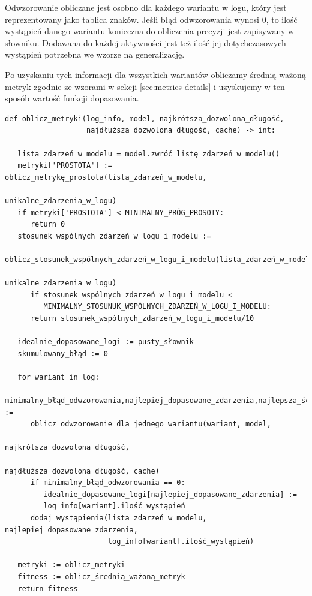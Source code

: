 Odwzorowanie obliczane jest osobno dla każdego wariantu w logu, który jest reprezentowany jako tablica znaków. Jeśli błąd odwzorowania wynosi 0, to ilość wystąpień danego wariantu konieczna do obliczenia precyzji jest zapisywany w słowniku. Dodawana do każdej aktywności jest też ilość jej dotychczasowych wystąpień potrzebna we wzorze na generalizację.

Po uzyskaniu tych informacji dla wszystkich wariantów obliczamy średnią ważoną metryk zgodnie ze wzorami w sekcji \ref{sec:metrics-details} i uzyskujemy w ten sposób wartość funkcji dopasowania.

\lstset{caption=Obliczanie metryk, captionpos=b}
\lstset{label=src:best_result, frame=single}
\begin{lstlisting}[escapeinside=``]
def oblicz_metryki(log_info, model, najkrótsza_dozwolona_długość, 
                   najdłuższa_dozwolona_długość, cache) -> int:
                   
   lista_zdarzeń_w_modelu = model.zwróć_listę_zdarzeń_w_modelu()
   metryki['PROSTOTA'] := oblicz_metrykę_prostota(lista_zdarzeń_w_modelu, 
                                                  unikalne_zdarzenia_w_logu)
   if metryki['PROSTOTA'] < MINIMALNY_PRÓG_PROSOTY:
      return 0
   stosunek_wspólnych_zdarzeń_w_logu_i_modelu := 
      oblicz_stosunek_wspólnych_zdarzeń_w_logu_i_modelu(lista_zdarzeń_w_modelu, 
                                                        unikalne_zdarzenia_w_logu)		   
      if stosunek_wspólnych_zdarzeń_w_logu_i_modelu <
         MINIMALNY_STOSUNUK_WSPÓLNYCH_ZDARZEŃ_W_LOGU_I_MODELU:
      return stosunek_wspólnych_zdarzeń_w_logu_i_modelu/10
        
   idealnie_dopasowane_logi := pusty_słownik
   skumulowany_błąd := 0
    
   for wariant in log:
      minimalny_błąd_odwzorowania,najlepiej_dopasowane_zdarzenia,najlepsza_ścieżka := 
      oblicz_odwzorowanie_dla_jednego_wariantu(wariant, model, 
                                              najkrótsza_dozwolona_długość, 
                                              najdłuższa_dozwolona_długość, cache)
      if minimalny_błąd_odwzorowania == 0:
         idealnie_dopasowane_logi[najlepiej_dopasowane_zdarzenia] := 
         log_info[wariant].ilość_wystąpień
      dodaj_wystąpienia(lista_zdarzeń_w_modelu, najlepiej_dopasowane_zdarzenia, 
                        log_info[wariant].ilość_wystąpień)

   metryki := oblicz_metryki 
   fitness := oblicz_średnią_ważoną_metryk
   return fitness
\end{lstlisting}

